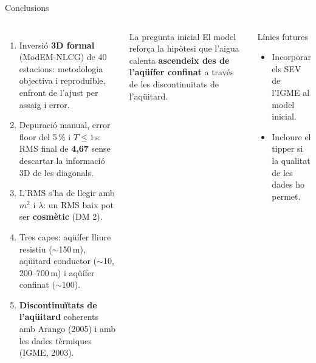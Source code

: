 \documentclass[10pt,aspectratio=169,t]{beamer}
\begin{document}
\begin{frame}{Conclusions}
\begin{columns}[T,onlytextwidth]
    \begin{enumerate}\footnotesize
      \setlength{\itemsep}{0.5em}
      \item Inversió \textbf{3D formal} (ModEM-NLCG) de 40 estacions: metodologia objectiva i reproduïble, enfront de l'ajust per assaig i error.
      \item Depuració manual, error floor del 5\,\% i $T \leq 1$\,s: RMS final de \alert{\textbf{4,67}} sense descartar la informació 3D de les diagonals.
      \item L'RMS s'ha de llegir amb $m^2$ i $\lambda$: un RMS baix pot ser \textbf{cosmètic} (DM 2).
      \item Tres capes: aqüífer lliure resistiu ($\sim$150\,m), aqüitard conductor ($\sim$10\ohmm, 200--700\,m) i aqüífer confinat ($\sim$100\ohmm).
      \item \textbf{Discontinuïtats de l'aqüitard} coherents amb Arango (2005) i amb les dades tèrmiques (IGME, 2003).
    \end{enumerate}
    \begin{caixa}[rho2]{La pregunta inicial}
      \footnotesize El model reforça la hipòtesi que l'aigua calenta \textbf{ascendeix des de l'aqüífer confinat} a través de les discontinuïtats de l'aqüitard.
    \end{caixa}
    \vspace{0.1cm}
    \begin{caixa}[accent2]{Línies futures}
      \begin{itemize}\scriptsize
        \item Incorporar els SEV de l'IGME al model inicial.
        \item Incloure el tipper si la qualitat de les dades ho permet.
      \end{itemize}
    \end{caixa}
\end{columns}
\end{frame}
\end{document}
